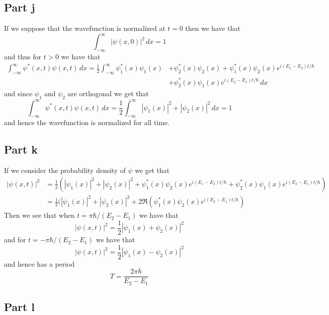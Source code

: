 \documentclass[12pt]{report}
\begin{document}
\subsection*{Part j}
If we suppose that the wavefunction is normalized at $t = 0$ then we have that
\begin{equation*}
  \int_{-\infty}^\infty |\psi(x,0)|^2 \, dx = 1
\end{equation*}
and thus for $t > 0$ we have that
\begin{align*}
  \int_{-\infty}^\infty \psi^*(x,t)\psi(x,t)\, dx = \frac{1}{2}\int_{-\infty}^\infty \psi_1^*(x)\psi_1(x) &+ \psi_2^*(x)\psi_2(x) + \psi_1^*(x)\psi_2(x)e^{i(E_1 - E_2)t/\hbar} \\ &+ \psi_2^*(x)\psi_1(x)e^{i(E_2 - E_1)t/\hbar} \, dx 
\end{align*}
and since $\psi_1$ and $\psi_2$ are orthogonal we get that
\begin{equation*}
  \int_{-\infty}^\infty \psi^*(x,t)\psi(x,t)\, dx = \frac{1}{2}\int_{-\infty}^\infty |\psi_1(x)|^2 + |\psi_2(x)|^2 \, dx = 1
\end{equation*}
and hence the wavefunction is normalized for all time.

\subsection*{Part k}
If we consider the probability density of $\psi$ we get that
\begin{align*}
  |\psi(x,t)|^2 &= \frac{1}{2}(|\psi_1(x)|^2 + |\psi_2(x)|^2 + \psi^*_1(x)\psi_2(x)e^{i(E_1 - E_2)t/\hbar} + \psi^*_2(x)\psi_1(x)e^{i(E_2 - E_1)t/\hbar}) \\
                &= \frac{1}{2}(|\psi_1(x)|^2 + |\psi_2(x)|^2 + 2\Re\left(\psi^*_1(x)\psi_2(x)e^{i(E_2 - E_1)t/\hbar}\right)
\end{align*}
Then we see that when $t = \pi\hbar/(E_2 - E_1)$ we have that
\begin{equation*}
  |\psi(x,t)|^2 = \frac{1}{2}|\psi_1(x) + \psi_2(x)|^2
\end{equation*}
and for $t = -\pi\hbar/(E_2 - E_1)$ we have that
\begin{equation*}
  |\psi(x,t)|^2 = \frac{1}{2}|\psi_1(x) - \psi_2(x)|^2
\end{equation*}
and hence has a period
\begin{equation*}
  T = \frac{2\pi\hbar}{E_2 - E_1}
\end{equation*}

\subsection*{Part l}
\end{document}
